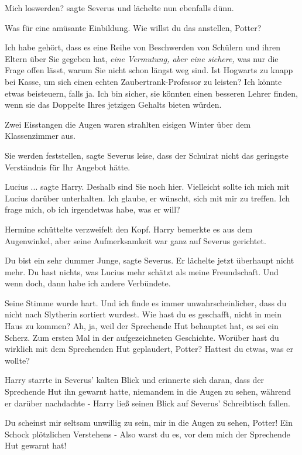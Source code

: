 \glqq{}Mich loswerden?\grqq{} sagte Severus und lächelte nun ebenfalls dünn.

\glqq{}Was für eine amüsante Einbildung. Wie willst du das anstellen,
Potter?\grqq{}

\glqq{}Ich habe gehört, dass es eine Reihe von Beschwerden von Schülern und ihren
Eltern über Sie gegeben hat\grqq{}, \emph{eine Vermutung, aber eine sichere,}
\glqq{}was nur die Frage offen lässt, warum Sie nicht schon längst weg sind. Ist
Hogwarts zu knapp bei Kasse, um sich einen echten Zaubertrank-Professor zu
leisten? Ich könnte etwas beisteuern, falls ja. Ich bin sicher, sie könnten
einen besseren Lehrer finden, wenn sie das Doppelte Ihres jetzigen Gehalts
bieten würden.\grqq{}

Zwei Eisstangen die Augen waren strahlten eisigen Winter über dem Klassenzimmer
aus.

\glqq{}Sie werden feststellen\grqq{}, sagte Severus leise, \glqq{}dass der
Schulrat nicht das geringste Verständnis für Ihr Angebot hätte.\grqq{}

\glqq{}Lucius ...\grqq{} sagte Harry. \glqq{}Deshalb sind Sie noch hier.
Vielleicht sollte ich mich mit Lucius darüber unterhalten. Ich glaube, er
wünscht, sich mit mir zu treffen. Ich frage mich, ob ich irgendetwas habe, was
er will?\grqq{}

Hermine schüttelte verzweifelt den Kopf. Harry bemerkte es aus dem Augenwinkel,
aber seine Aufmerksamkeit war ganz auf Severus gerichtet.

\glqq{}Du bist ein sehr dummer Junge\grqq{}, sagte Severus. Er lächelte jetzt
überhaupt nicht mehr. \glqq{}Du hast nichts, was Lucius mehr schätzt als meine
Freundschaft. Und wenn doch, dann habe ich andere Verbündete.\grqq{}

Seine Stimme wurde hart. \glqq{}Und ich finde es immer unwahrscheinlicher, dass
du nicht nach Slytherin sortiert wurdest. Wie hast du es geschafft, nicht in
mein Haus zu kommen? Ah, ja, weil der Sprechende Hut behauptet hat, es sei ein
Scherz. Zum ersten Mal in der aufgezeichneten Geschichte. Worüber hast du
wirklich mit dem Sprechenden Hut geplaudert, Potter? Hattest du etwas, was er
wollte?\grqq{}

Harry starrte in Severus' kalten Blick und erinnerte sich daran, dass der
Sprechende Hut ihn gewarnt hatte, niemandem in die Augen zu sehen, während er
darüber nachdachte - Harry ließ seinen Blick auf Severus' Schreibtisch fallen.

\glqq{}Du scheinst mir seltsam unwillig zu sein, mir in die Augen zu sehen,
Potter!\grqq{} Ein Schock plötzlichen Verstehens - \glqq{}Also warst du es, vor
dem mich der Sprechende Hut gewarnt hat!\grqq{}

